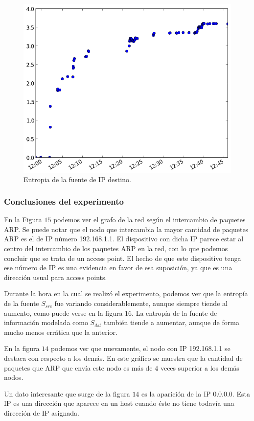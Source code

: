 \begin{figure}[H]
  \centering
	\includegraphics[scale=0.66]{../experimentacion-barbeiton/entropy_dst.png}
  \caption{Entropia de la fuente de IP destino.}
\end{figure}

\subsubsection{Conclusiones del experimento}
En la Figura $15$ podemos ver el grafo de la red según el intercambio de paquetes ARP. Se puede notar que el nodo que intercambia la mayor cantidad de paquetes ARP es el de IP número 192.168.1.1. El dispositivo con dicha IP parece estar al centro del intercambio de los paquetes ARP en la red, con lo que podemos concluir que se trata de un access point. El hecho de que este dispositivo tenga ese número de IP es una evidencia en favor de esa suposición, ya que es una dirección usual para access points.
\par Durante la hora en la cual se realizó el experimento, podemos ver que la entropía de la fuente $S_{src}$ fue variando considerablemente, aunque siempre tiende al aumento, como puede verse en la figura $16$. La entropía de la fuente de información modelada como $S_{dst}$ también tiende a aumentar, aunque de forma mucho menos errática que la anterior. 
\par En la figura $14$ podemos ver que nuevamente, el nodo con IP 192.168.1.1 se destaca con respecto a los demás. En este gráfico se muestra que la cantidad de paquetes que ARP que envía este nodo es más de $4$ veces superior a los demás nodos. 
\par Un dato interesante que surge de la figura $14$ es la aparición de la IP 0.0.0.0. Esta IP es una dirección que aparece en un host cuando éste no tiene todavía una dirección de IP asignada.

